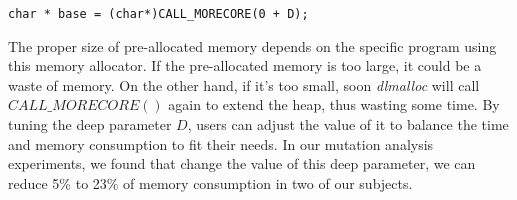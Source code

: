 \begin{lstlisting}
char * base = (char*)CALL_MORECORE(0 + D);
\end{lstlisting}

The proper size of pre-allocated memory depends on the specific program using this memory allocator. If the pre-allocated memory is too large, it could be a waste of memory. On the other hand, if it's too small, soon \emph{dlmalloc} will call $CALL\_MORECORE()$ again to extend the heap, thus wasting some time. By tuning the deep parameter $D$, users can adjust the value of it to balance the time and memory consumption to fit their needs. In our mutation analysis experiments,  we found that change the value of this deep parameter, we can reduce 5\% to 23\% of memory consumption in two of our subjects.

